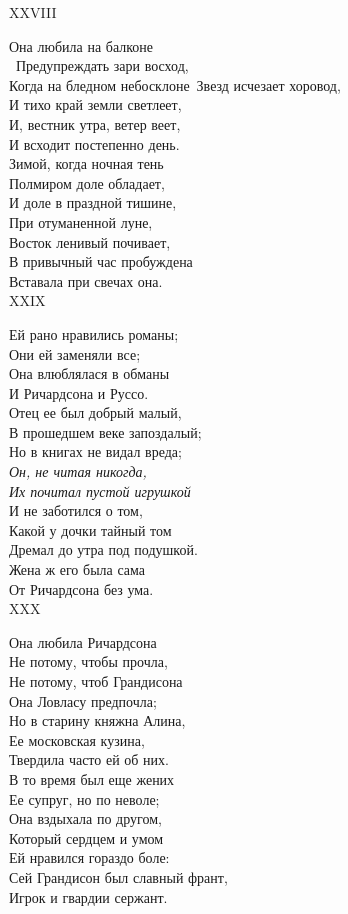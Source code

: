 XXVIII

Она любила на балконе\\\
Предупреждать зари восход,\\
Когда на бледном небосклоне\
Звезд исчезает хоровод,\\
И тихо край земли светлеет,\\
И, вестник утра, ветер веет,\\
И всходит постепенно день.\\
Зимой, когда ночная тень\\
Полмиром доле обладает,\\
И доле в праздной тишине,\\
При отуманенной луне,\\
Восток ленивый почивает,\\
В привычный час пробуждена\\
Вставала при свечах она.\\

XXIX

Ей рано нравились романы;\\
Они ей заменяли все;\\
Она влюблялася в обманы\\
И Ричардсона и Руссо.\\
Отец ее был добрый малый,\\
В прошедшем веке запоздалый;\\
Но в книгах не видал вреда;\\
\emph{Он, не читая никогда,\\
Их почитал пустой игрушкой}\\
И не заботился о том,\\
Какой у дочки тайный том\\
Дремал до утра под подушкой.\\
Жена ж его была сама\\
От Ричардсона без ума.\\

XXX

Она любила Ричардсона\\
Не потому, чтобы прочла,\\
Не потому, чтоб Грандисона\\
Она Ловласу предпочла;\\
Но в старину княжна Алина,\\
Ее московская кузина,\\
Твердила часто ей об них.\\
В то время был еще жених\\
Ее супруг, но по неволе;\\
Она вздыхала по другом,\\
Который сердцем и умом\\
Ей нравился гораздо боле:\\
Сей Грандисон был славный франт,\\
Игрок и гвардии сержант.\\

